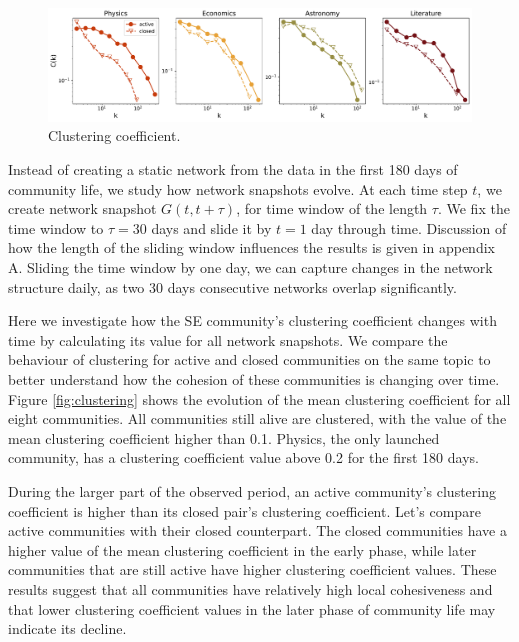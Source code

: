 \begin{figure}[h]
	\centering
	\includegraphics[width=\linewidth]{figures/stackexchange/clustering_fullnet.pdf}
	\caption{Clustering coefficient.}
	\label{fig:fullclustering}
\end{figure}

Instead of creating a static network from the data in the first 180 days of community life, we study how network snapshots evolve. At each time step $t$, we create network snapshot $G(t, t+\tau)$, for time window of the length $\tau$. We fix the time window to $\tau=30$ days and slide it by $t=1$ day through time. Discussion of how the length of the sliding window influences the results is given in appendix A. Sliding the time window by one day, we can capture changes in the network structure daily, as two 30 days consecutive networks overlap significantly. 

Here we investigate how the SE community's clustering coefficient changes with time by calculating its value for all network snapshots. We compare the behaviour of clustering for active and closed communities on the same topic to better understand how the cohesion of these communities is changing over time. Figure \ref{fig:clustering} shows the evolution of the mean clustering coefficient for all eight communities. All communities still alive are clustered, with the value of the mean clustering coefficient higher than 0.1. Physics, the only launched community, has a clustering coefficient value above 0.2 for the first 180 days.

During the larger part of the observed period, an active community's clustering coefficient is higher than its closed pair's clustering coefficient. Let's compare active communities with their closed counterpart. The closed communities have a higher value of the mean clustering coefficient in the early phase, while later communities that are still active have higher clustering coefficient values. These results suggest that all communities have relatively high local cohesiveness and that lower clustering coefficient values in the later phase of community life may indicate its decline. 


